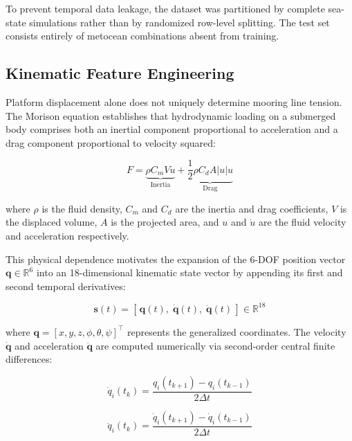 \documentclass[preprint,12pt]{elsarticle}
\begin{document}
To prevent temporal data leakage, the dataset was partitioned by complete sea-state simulations rather than by randomized row-level splitting. The test set consists entirely of metocean combinations absent from training.

\subsection{Kinematic Feature Engineering}
\label{sec:feature_engineering}

Platform displacement alone does not uniquely determine mooring line tension. The Morison equation \cite{morison1950force} establishes that hydrodynamic loading on a submerged body comprises both an inertial component proportional to acceleration and a drag component proportional to velocity squared:

\begin{equation}
\label{eq:morison}
    F = \underbrace{\rho C_m V \dot{u}}_{\text{Inertia}} + \underbrace{\frac{1}{2} \rho C_d A |u| u}_{\text{Drag}}
\end{equation}

\noindent where $\rho$ is the fluid density, $C_m$ and $C_d$ are the inertia and drag coefficients, $V$ is the displaced volume, $A$ is the projected area, and $u$ and $\dot{u}$ are the fluid velocity and acceleration respectively.

This physical dependence motivates the expansion of the 6-DOF position vector $\mathbf{q} \in \mathbb{R}^6$ into an 18-dimensional kinematic state vector by appending its first and second temporal derivatives:

\begin{equation}
\label{eq:state_vector}
    \mathbf{s}(t) = \left[\, \mathbf{q}(t),\; \dot{\mathbf{q}}(t),\; \ddot{\mathbf{q}}(t) \,\right] \in \mathbb{R}^{18}
\end{equation}

\noindent where $\mathbf{q} = [x, y, z, \phi, \theta, \psi]^\top$ represents the generalized coordinates. The velocity $\dot{\mathbf{q}}$ and acceleration $\ddot{\mathbf{q}}$ are computed numerically via second-order central finite differences:

\begin{equation}
\label{eq:velocity}
    \dot{q}_i(t_k) = \frac{q_i(t_{k+1}) - q_i(t_{k-1})}{2\Delta t}
\end{equation}

\begin{equation}
\label{eq:acceleration}
    \ddot{q}_i(t_k) = \frac{\dot{q}_i(t_{k+1}) - \dot{q}_i(t_{k-1})}{2\Delta t}
\end{equation}
\end{document}
